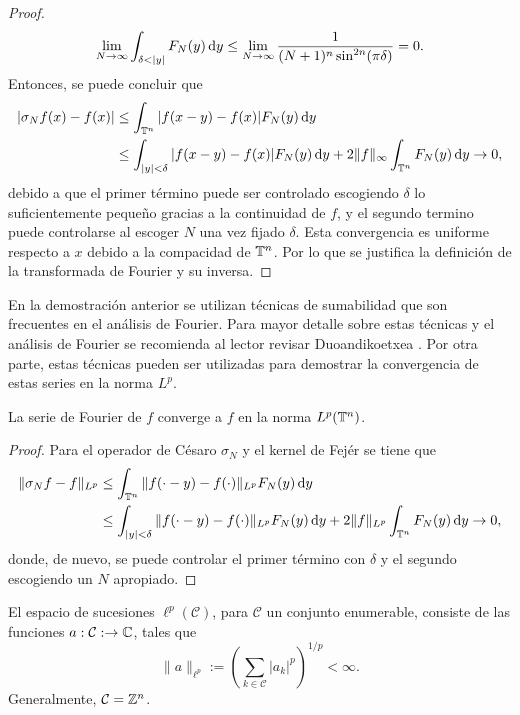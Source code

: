 \begin{proof}
	 \begin{equation*}
	 	\lim_{N\to\infty}\int_{\delta<|y|} F_N(y) \diff y \leq \lim_{N\to\infty} \frac{1}{(N+1)^n\sin^{2n}(\pi \delta)} =0.
	 \end{equation*}
	 Entonces, se puede concluir que 
	 \begin{align*}
	 	|\sigma_Nf(x) - f(x)| & \leq \int_{\mathbb{T}^n} |f(x-y) - f(x)| F_N(y) \mathop{}\!\mathrm{d} y \\
	 	& \leq \int_{|y|<\delta} |f(x-y) - f(x)|F_N(y) \mathop{}\!\mathrm{d} y +2\|f\|_\infty \int_{\mathbb{T}^n} F_N(y) \mathop{}\!\mathrm{d} y \to 0,
	 \end{align*}
	 debido a que el primer término puede ser controlado escogiendo $\delta$ lo suficientemente pequeño gracias a la continuidad de $f$, y el segundo termino puede controlarse al escoger $N$ una vez fijado $\delta$. Esta convergencia es uniforme respecto a $x$ debido a la compacidad de $\mathbb{T}^n$. Por lo que se justifica la definición de la transformada de Fourier y su inversa.
\end{proof}
\begin{remark}
	En la demostración anterior se utilizan técnicas de sumabilidad que son frecuentes en el análisis de Fourier. Para mayor detalle sobre estas técnicas y el análisis de Fourier se recomienda al lector revisar Duoandikoetxea \cite{duoandikoetxea}. Por otra parte, estas técnicas pueden ser utilizadas para demostrar la convergencia de estas series en la norma $L^p$.
\end{remark}
\begin{theorem}
	La serie de Fourier de $f$ converge a $f$ en la norma $L^p(\mathbb{T}^n)$.
\end{theorem}
\begin{proof}
	Para el operador de Césaro $\sigma_N$ y el kernel de Fejér se tiene que 
	\begin{align*}
		\|\sigma_Nf -f\|_{L^p}  & \leq \int_{\mathbb{T}^n} \|f(\cdot-y) - f(\cdot)\|_{L^p} F_N(y) \mathop{}\!\mathrm{d} y \\
		& \leq \int_{|y|<\delta} \|f(\cdot-y) - f(\cdot)\|_{L^p}F_N(y) \mathop{}\!\mathrm{d} y +2\|f\|_{L^p} \int_{\mathbb{T}^n} F_N(y) \mathop{}\!\mathrm{d} y \to 0,
	\end{align*}
	donde, de nuevo, se puede controlar el primer término con $\delta$ y el segundo escogiendo un $N$ apropiado. 
\end{proof}
\begin{definition}
	El espacio de sucesiones $\ell^p(\mathcal{C})$, para $\mathcal{C}$ un conjunto enumerable, consiste de las funciones $a:\mathcal{C}:\to\mathbb{C}$, tales que 
	\begin{equation*}
		\|a\|_{\ell^p} := \left( \sum_{k\in\mathcal{C}}|a_k|^p \right)^{1/p} <\infty.
	\end{equation*}
	Generalmente, $\mathcal{C}=\mathbb{Z}^n$.
\end{definition}
